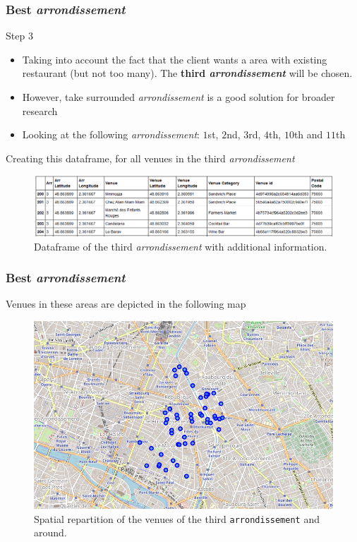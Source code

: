 \documentclass{beamer}
\begin{document}
\begin{frame}
	\frametitle{Best \textit{arrondissement}}
	\begin{block}{Step 3}
		\begin{itemize}
			\item Taking into account the fact that the client wants a area with existing restaurant (but not too many). The \textbf{third \textit{arrondissement}} will be chosen. 
			\item However, take surrounded \textit{arrondissement} is a good solution for broader research
			\item Looking at the following \textit{arrondissement}: $1$st, $2$nd, $3$rd, $4$th, $10$th and $11$th
		\end{itemize}
	\end{block}	
	Creating this dataframe, for all venues in the third \textit{arrondissement}
	\begin{figure}[h]
		\centering
		\includegraphics[width=\linewidth,keepaspectratio]{Figures/DataFraleThird}
		\caption{Dataframe of the third \textit{arrondissement} with additional information.}
		\label{DataFramesThird}
	\end{figure}
\end{frame}

\begin{frame}
	\frametitle{Best \textit{arrondissement}}
	Venues in these areas are depicted in the following map
	\begin{figure}[h!]
		\centering
		\includegraphics[width=0.80\linewidth,keepaspectratio]{Figures/FoliumUnclustered}
		\caption{Spatial repartition of the venues of the third \texttt{arrondissement} and around.}
		\label{FoliumMap}
	\end{figure}
\end{frame}
\end{document}
